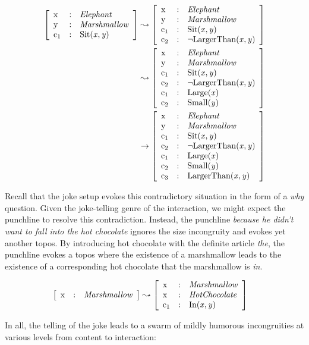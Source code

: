 \documentclass[a4]{scrartcl}
\let\lbl\operatorname
\newenvironment{ttr}{\left[\begin{array}{lcl}}{\end{array}\right]}
\newcommand{\tf}[2]{\lbl{#1} & : & \mathit{#2}\\}
\newcommand{\type}[1]{\ensuremath{\mathit{#1}}}
\newcommand{\ptype}[2]{\ensuremath{\mathrm{#1}(#2)}}
\begin{document}
\begin{align*}
\begin{ttr}
  \tf{x}{\type{Elephant}}
  \tf{y}{\type{Marshmallow}}
  \tf{c_1}{\ptype{Sit}{x,y}}
\end{ttr} & \leadsto
\begin{ttr}
  \tf{x}{\type{Elephant}}
  \tf{y}{\type{Marshmallow}}
  \tf{c_1}{\ptype{Sit}{x,y}}
  \tf{c_2}{\ptype{\lnot LargerThan}{x,y}}
\end{ttr}\\ & \leadsto
\begin{ttr}
  \tf{x}{\type{Elephant}}
  \tf{y}{\type{Marshmallow}}
  \tf{c_1}{\ptype{Sit}{x,y}}
  \tf{c_2}{\ptype{\lnot LargerThan}{x,y}}
  \tf{c_1}{\ptype{Large}{x}}
  \tf{c_2}{\ptype{Small}{y}}
\end{ttr} \\ & \rightarrow
\begin{ttr}
  \tf{x}{\type{Elephant}}
  \tf{y}{\type{Marshmallow}}
  \tf{c_1}{\ptype{Sit}{x,y}}
  \tf{c_2}{\ptype{\lnot LargerThan}{x,y}}
  \tf{c_1}{\ptype{Large}{x}}
  \tf{c_2}{\ptype{Small}{y}}
  \tf{c_3}{\ptype{LargerThan}{x,y}}
\end{ttr} 
\end{align*}

Recall that the joke setup evokes this contradictory situation in the
form of a \emph{why} question.
Given the joke-telling genre of the interaction,
we might expect the punchline to resolve this contradiction.
Instead, the punchline 
\textit{because he didn't want to fall into the hot chocolate}
ignores the size incongruity and evokes yet another topos.
By introducing hot chocolate with the definite article \textit{the},
the punchline evokes a topos where the existence of a marshmallow
leads to the existence of a corresponding hot chocolate that the marshmallow is \textit{in}.

\begin{align*}
\begin{ttr}
  \tf{x}{\type{Marshmallow}}
\end{ttr} & \leadsto
\begin{ttr}
  \tf{x}{\type{Marshmallow}}
  \tf{x}{\type{HotChocolate}}
  \tf{c_1}{\ptype{In}{x,y}}
\end{ttr}
\end{align*}

In all, the telling of the joke leads to a swarm of mildly humorous incongruities 
at various levels from content to interaction:
\end{document}
